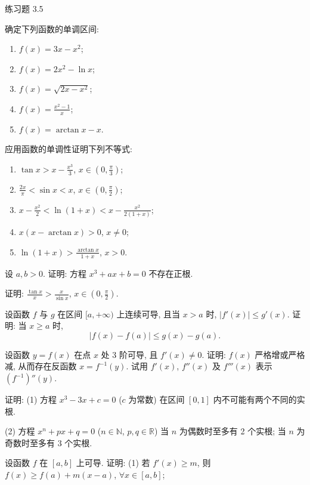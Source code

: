 \begin{exblock}{练习题 3.5}
  \item 确定下列函数的单调区间:
  \begin{enumerate}[label=(\arabic*)]
    \item $f(x)=3x-x^{2}$;
    \item $f(x)=2x^{2}-\ln x$;
    \item $f(x)=\sqrt{2x-x^{2}}$;
    \item $f(x)=\frac{x^{2}-1}{x}$;
    \item $f(x)=\arctan x-x$.
  \end{enumerate}

  \item 应用函数的单调性证明下列不等式:
  \begin{enumerate}[label=(\arabic*)]
    \item $\tan x>x-\frac{x^{3}}{3}$, $x\in\left(0,\frac{\pi}{3}\right)$;
    \item $\frac{2x}{\pi}<\sin x<x$, $x\in\left(0,\frac{\pi}{2}\right)$;
    \item $x-\frac{x^{2}}{2}<\ln(1+x)<x-\frac{x^{2}}{2(1+x)}$;
    \item $x(x-\arctan x)>0$, $x\neq 0$;
    \item $\ln(1+x)>\frac{\arctan x}{1+x}$, $x>0$.
  \end{enumerate}

  \item 设 $a,b>0$. 证明: 方程 $x^{3}+ax+b=0$ 不存在正根.

  \item 证明: $\frac{\tan x}{x}>\frac{x}{\sin x}$, $x\in\left(0,\frac{\pi}{2}\right)$.

  \item 设函数 $f$ 与 $g$ 在区间 $[a,+\infty)$ 上连续可导, 且当 $x>a$ 时, $|f'(x)|\leqslant g'(x)$. 证明: 当 $x\geqslant a$ 时,
  \[
  |f(x)-f(a)|\leqslant g(x)-g(a).
\]

  \item 设函数 $y=f(x)$ 在点 $x$ 处 3 阶可导, 且 $f'(x)\neq 0$. 证明: $f(x)$ 严格增或严格减, 从而存在反函数 $x=f^{-1}(y)$. 试用 $f'(x)$, $f''(x)$ 及 $f'''(x)$ 表示 $(f^{-1})''(y)$.

  \item 证明:
  (1) 方程 $x^{3}-3x+c=0$ ($c$ 为常数) 在区间 $[0,1]$ 内不可能有两个不同的实根.

  (2) 方程 $x^{n}+px+q=0$ ($n\in\mathbb{N}$, $p,q\in\mathbb{R}$) 当 $n$ 为偶数时至多有 2 个实根; 当 $n$ 为奇数时至多有 3 个实根.

  \item 设函数 $f$ 在 $[a,b]$ 上可导. 证明:
  (1) 若 $f'(x)\geqslant m$, 则 $f(x)\geqslant f(a)+m(x-a)$, $\forall x\in[a,b]$;


\end{exblock}
